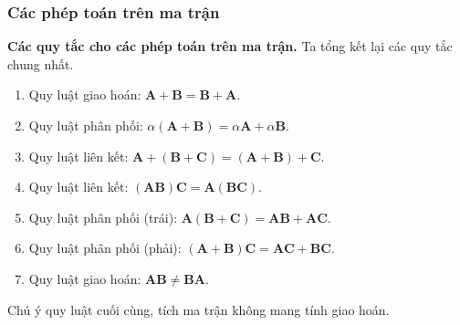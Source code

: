 \begin{frame}
    \frametitle{Các phép toán trên ma trận}
    \textbf{Các quy tắc cho các phép toán trên ma trận.} Ta tổng kết lại các quy tắc chung nhất.
    \begin{enumerate}
    \item Quy luật giao hoán: \(\mathbf{A}+\mathbf{B}=\mathbf{B}+\mathbf{A}\).
    \item Quy luật phân phối: \(\alpha(\mathbf{A}+\mathbf{B})=\alpha\mathbf{A}+\alpha\mathbf{B}\).
    \item Quy luật liên kết: \(\mathbf{A}+(\mathbf{B}+\mathbf{C})=(\mathbf{A}+\mathbf{B})+\mathbf{C}\).
    \item Quy luật liên kết: \((\mathbf{AB})\mathbf{C}=\mathbf{A}(\mathbf{BC})\).
    \item Quy luật phân phối (trái): \(\mathbf{A}(\mathbf{B}+\mathbf{C})=\mathbf{AB}+\mathbf{AC}\).
    \item Quy luật phân phối (phải): \((\mathbf{A}+\mathbf{B})\mathbf{C}=\mathbf{AC}+\mathbf{BC}\).
    \item Quy luật giao hoán: \(\mathbf{AB} \neq \mathbf{BA}\).
\end{enumerate}
Chú ý quy luật cuối cùng, tích ma trận không mang tính giao hoán.
\end{frame}
